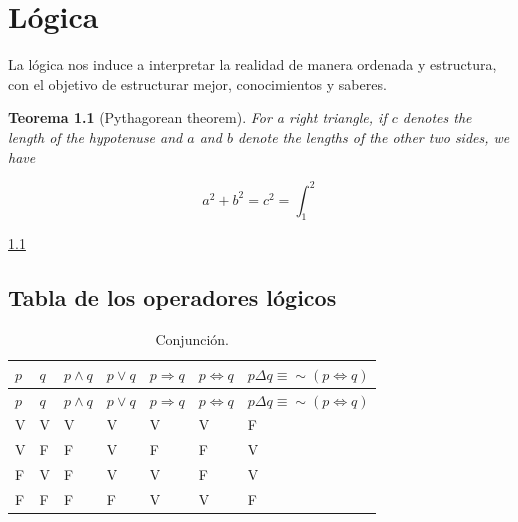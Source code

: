 \documentclass[
  16pt,
]{krantz}
\newtheorem{theorem}{Teorema}[chapter]
\theoremstyle{definition}
\theoremstyle{definition}
\theoremstyle{definition}
\theoremstyle{definition}
\theoremstyle{remark}
\begin{document}
\mainmatter

\hypertarget{luxf3gica}{%
\chapter{Lógica}\label{luxf3gica}}

La lógica nos induce a interpretar la realidad de manera ordenada y estructura, con el objetivo de estructurar mejor, conocimientos y saberes.

\begin{theorem}[Pythagorean theorem]
\protect\hypertarget{thm:pyth}{}\label{thm:pyth}For a right triangle, if \(c\) denotes the length of the hypotenuse
and \(a\) and \(b\) denote the lengths of the other two sides, we have

\[a^2 + b^2 = c^2=\int_1^2\]
\end{theorem}

\citet{vincze2014college}

\ref{thm:pyth}

\hypertarget{tabla-de-los-operadores-luxf3gicos}{%
\section{Tabla de los operadores lógicos}\label{tabla-de-los-operadores-luxf3gicos}}

\begin{longtable}[]{@{}
  >{\raggedright\arraybackslash}p{}
  >{\raggedright\arraybackslash}p{}
  >{\raggedleft\arraybackslash}p{}
  >{\raggedleft\arraybackslash}p{}
  >{\raggedleft\arraybackslash}p{}
  >{\raggedleft\arraybackslash}p{}
  >{\raggedleft\arraybackslash}p{}@{}}
\caption{\label{tab:ww} Conjunción.}\tabularnewline
\toprule
\(p\) & \(q\) & \(p\wedge q\) & \(p\vee q\) & \(p\Longrightarrow q\) & \(p\Longleftrightarrow q\) & \(p\Delta q\equiv \sim (p\Longleftrightarrow q)\) \\
\midrule
\endfirsthead
\toprule
\(p\) & \(q\) & \(p\wedge q\) & \(p\vee q\) & \(p\Longrightarrow q\) & \(p\Longleftrightarrow q\) & \(p\Delta q\equiv \sim (p\Longleftrightarrow q)\) \\
\midrule
\endhead
V & V & V & V & V & V & F \\
V & F & F & V & F & F & V \\
F & V & F & V & V & F & V \\
F & F & F & F & V & V & F \\
\bottomrule
\end{longtable}
\end{document}
